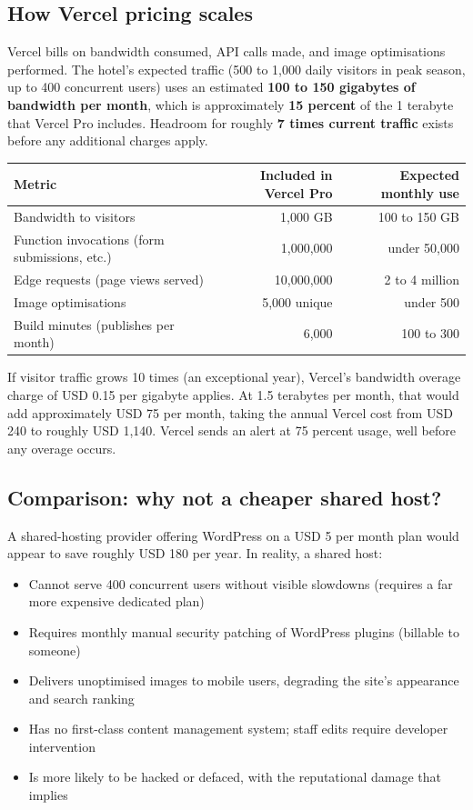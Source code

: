 \documentclass[11pt,a4paper]{article}
\begin{document}
\subsection{How Vercel pricing scales}

Vercel bills on bandwidth consumed, API calls made, and image optimisations performed. The hotel's expected traffic (500 to 1{,}000 daily visitors in peak season, up to 400 concurrent users) uses an estimated \textbf{100 to 150 gigabytes of bandwidth per month}, which is approximately \textbf{15 percent} of the 1 terabyte that Vercel Pro includes. Headroom for roughly \textbf{7 times current traffic} exists before any additional charges apply.

\begin{tabularx}{\textwidth}{@{} X r r @{}}
\toprule
\textbf{Metric} & \textbf{Included in Vercel Pro} & \textbf{Expected monthly use} \\
\midrule
Bandwidth to visitors & 1{,}000 GB & 100 to 150 GB \\
Function invocations (form submissions, etc.) & 1{,}000{,}000 & under 50{,}000 \\
Edge requests (page views served) & 10{,}000{,}000 & 2 to 4 million \\
Image optimisations & 5{,}000 unique & under 500 \\
Build minutes (publishes per month) & 6{,}000 & 100 to 300 \\
\bottomrule
\end{tabularx}

If visitor traffic grows 10 times (an exceptional year), Vercel's bandwidth overage charge of USD 0.15 per gigabyte applies. At 1.5 terabytes per month, that would add approximately USD 75 per month, taking the annual Vercel cost from USD 240 to roughly USD 1{,}140. Vercel sends an alert at 75 percent usage, well before any overage occurs.

\subsection{Comparison: why not a cheaper shared host?}

A shared-hosting provider offering WordPress on a USD 5 per month plan would appear to save roughly USD 180 per year. In reality, a shared host:

\begin{itemize}
\item Cannot serve 400 concurrent users without visible slowdowns (requires a far more expensive dedicated plan)
\item Requires monthly manual security patching of WordPress plugins (billable to someone)
\item Delivers unoptimised images to mobile users, degrading the site's appearance and search ranking
\item Has no first-class content management system; staff edits require developer intervention
\item Is more likely to be hacked or defaced, with the reputational damage that implies
\end{itemize}
\end{document}
